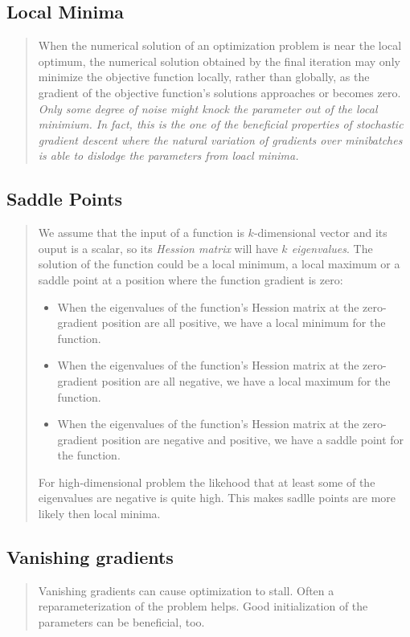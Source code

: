 \subsection{Local Minima}
\begin{quotation}
    When the numerical solution of an optimization problem is near the local optimum, the numerical
    solution obtained by the final iteration may only minimize the objective function locally, rather
    than globally, as the gradient of the objective function's solutions approaches or becomes zero.
    \textit{Only some degree of noise might knock the parameter out of the local minimium. In fact,
        this is the one of the beneficial properties of stochastic gradient descent where the natural variation
        of gradients over minibatches is able to dislodge the parameters from loacl minima.}\cite{zhang2020dive}
\end{quotation}
\subsection{Saddle Points}
\begin{quotation}
    We assume that the input of a function is $k$-dimensional vector and its ouput is a scalar,
    so its \textit{Hession matrix} will have \textit{$k$ eigenvalues}. The solution of the function could
    be a local minimum, a local maximum or a saddle point at a position where the function gradient
    is zero:
    \begin{itemize}
        \item When the eigenvalues of the function's Hession matrix at the zero-gradient position 
        are all positive, we have a local minimum for the function.
        \item When the eigenvalues of the function's Hession matrix at the zero-gradient position 
        are all negative, we have a local maximum for the function.
        \item When the eigenvalues of the function's Hession matrix at the zero-gradient position 
        are negative and positive, we have a saddle point for the function.
    \end{itemize}
    For high-dimensional problem the likehood that at least some of the eigenvalues are negative
    is quite high. This makes sadlle points are more likely then local minima.\cite{zhang2020dive}
\end{quotation}

\subsection{Vanishing gradients}
\begin{quotation}
    Vanishing gradients can cause optimization to stall. Often a reparameterization of the problem
     helps. Good initialization of the parameters can be beneficial, too.\cite{zhang2020dive}
\end{quotation}

